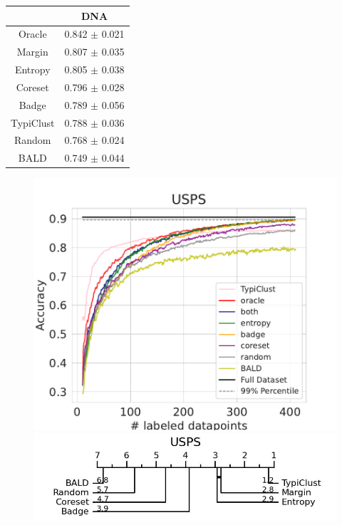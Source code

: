\documentclass[]{article}
\begin{document}
\begin{minipage}{0.29\linewidth}
\begin{tabular}{c|c}
&DNA \\
\hline
Oracle&0.842 $\pm$ 0.021\\
Margin&0.807 $\pm$ 0.035\\
Entropy&0.805 $\pm$ 0.038\\
Coreset&0.796 $\pm$ 0.028\\
Badge&0.789 $\pm$ 0.056\\
TypiClust&0.788 $\pm$ 0.036\\
Random&0.768 $\pm$ 0.024\\
BALD&0.749 $\pm$ 0.044\\
\end{tabular}
\end{minipage}
\begin{minipage}{0.65\linewidth}
\begin{figure}[H]
    \centering
	\includegraphics[width=\linewidth]{img/eval_usps} \\ [2mm]
	\includegraphics[width=\linewidth]{img/micro_usps.jpg}
\end{figure}
\end{minipage}
\end{document}
